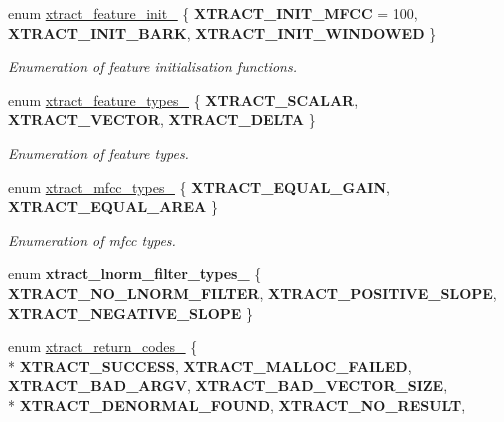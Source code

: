 \begin{DoxyCompactItemize}
enum \hyperlink{group__libxtract_gac1581b4b50dabedac7f63b5dc5d9d600}{xtract\-\_\-feature\-\_\-init\-\_\-} \{ {\bfseries X\-T\-R\-A\-C\-T\-\_\-\-I\-N\-I\-T\-\_\-\-M\-F\-C\-C} = 100, 
{\bfseries X\-T\-R\-A\-C\-T\-\_\-\-I\-N\-I\-T\-\_\-\-B\-A\-R\-K}, 
{\bfseries X\-T\-R\-A\-C\-T\-\_\-\-I\-N\-I\-T\-\_\-\-W\-I\-N\-D\-O\-W\-E\-D}
 \}
\begin{DoxyCompactList}\small\item\em Enumeration of feature initialisation functions. \end{DoxyCompactList}\item 
enum \hyperlink{group__libxtract_ga698bb87e3cd167843b7ac04830a092e3}{xtract\-\_\-feature\-\_\-types\-\_\-} \{ {\bfseries X\-T\-R\-A\-C\-T\-\_\-\-S\-C\-A\-L\-A\-R}, 
{\bfseries X\-T\-R\-A\-C\-T\-\_\-\-V\-E\-C\-T\-O\-R}, 
{\bfseries X\-T\-R\-A\-C\-T\-\_\-\-D\-E\-L\-T\-A}
 \}
\begin{DoxyCompactList}\small\item\em Enumeration of feature types. \end{DoxyCompactList}\item 
enum \hyperlink{group__libxtract_ga5227e65adebca97a8aaceccb170b72d5}{xtract\-\_\-mfcc\-\_\-types\-\_\-} \{ {\bfseries X\-T\-R\-A\-C\-T\-\_\-\-E\-Q\-U\-A\-L\-\_\-\-G\-A\-I\-N}, 
{\bfseries X\-T\-R\-A\-C\-T\-\_\-\-E\-Q\-U\-A\-L\-\_\-\-A\-R\-E\-A}
 \}
\begin{DoxyCompactList}\small\item\em Enumeration of mfcc types. \end{DoxyCompactList}\item 
enum {\bfseries xtract\-\_\-lnorm\-\_\-filter\-\_\-types\-\_\-} \{ {\bfseries X\-T\-R\-A\-C\-T\-\_\-\-N\-O\-\_\-\-L\-N\-O\-R\-M\-\_\-\-F\-I\-L\-T\-E\-R}, 
{\bfseries X\-T\-R\-A\-C\-T\-\_\-\-P\-O\-S\-I\-T\-I\-V\-E\-\_\-\-S\-L\-O\-P\-E}, 
{\bfseries X\-T\-R\-A\-C\-T\-\_\-\-N\-E\-G\-A\-T\-I\-V\-E\-\_\-\-S\-L\-O\-P\-E}
 \}
\item 
enum \hyperlink{group__libxtract_ga12b675af8bf1d925a5a5fa9eb014800e}{xtract\-\_\-return\-\_\-codes\-\_\-} \{ \\*
{\bfseries X\-T\-R\-A\-C\-T\-\_\-\-S\-U\-C\-C\-E\-S\-S}, 
{\bfseries X\-T\-R\-A\-C\-T\-\_\-\-M\-A\-L\-L\-O\-C\-\_\-\-F\-A\-I\-L\-E\-D}, 
{\bfseries X\-T\-R\-A\-C\-T\-\_\-\-B\-A\-D\-\_\-\-A\-R\-G\-V}, 
{\bfseries X\-T\-R\-A\-C\-T\-\_\-\-B\-A\-D\-\_\-\-V\-E\-C\-T\-O\-R\-\_\-\-S\-I\-Z\-E}, 
\\*
{\bfseries X\-T\-R\-A\-C\-T\-\_\-\-D\-E\-N\-O\-R\-M\-A\-L\-\_\-\-F\-O\-U\-N\-D}, 
{\bfseries X\-T\-R\-A\-C\-T\-\_\-\-N\-O\-\_\-\-R\-E\-S\-U\-L\-T}, 

\end{DoxyCompactItemize}
